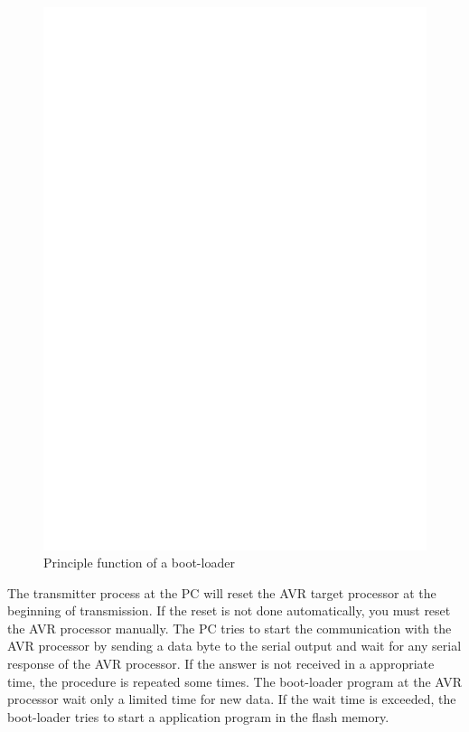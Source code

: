 \begin{figure}[H]
\centering
\includegraphics[]{../FIG/ablauf.eps}
\caption{Principle function of a boot-loader}
\label{fig:ablauf}
\end{figure}

The transmitter process at the PC will reset the AVR target processor at
the beginning of transmission.
If the reset is not done automatically, you must reset the AVR processor 
manually. 
The PC tries to start the communication with the AVR processor by sending
a data byte to the serial output and wait for any serial response of
the AVR processor.
If the answer is not received in a appropriate time, the procedure is repeated
some times.
The boot-loader program at the AVR processor wait only a limited time for
new data. If the wait time is exceeded, the boot-loader tries to
start a application program in the flash memory.
